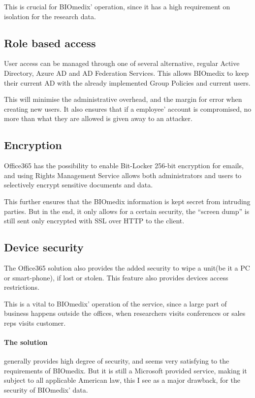 \documentclass[paper=a4, fontsize=11pt]{scrartcl} %
\numberwithin{equation}{section} %
\numberwithin{figure}{section} %
\numberwithin{table}{section} %
\begin{document}
This is crucial for BIOmedix' operation, since it has a high requirement on
isolation for the research data. 

\subsection{Role based access}
User access can be managed through one of several alternative, regular Active
Directory, Azure AD and AD Federation Services. This allows BIOmedix to keep
their current AD with the already implemented Group Policies and current users.

This will minimise the administrative overhead, and the margin for error when
creating new users. It also ensures that if a employee' account is compromised,
no more than what they are allowed is given away to an attacker.

\subsection{Encryption}
Office365 has the possibility to enable Bit-Locker 256-bit encryption for
emails, and using Rights Management Service allows both administrators and
users to selectively encrypt sensitive documents and data.

This further ensures that the BIOmedix information is kept secret from
intruding parties. But in the end, it only allows for a certain security, the
``screen dump'' is still sent only encrypted with SSL over HTTP to the client.

\subsection{Device security}
The Office365 solution also provides the added security to wipe a unit(be it a
PC or smart-phone), if lost or stolen. This feature also provides devices access
restrictions.

This is a vital to BIOmedix' operation of the service, since a large part of
business happens outside the offices, when researchers visits conferences or
sales reps visits customer.

\paragraph{The solution} generally provides high degree of security, and seems
very satisfying to the requirements of BIOmedix. But it is still a Microsoft
provided service, making it subject to all applicable American law, this I see
as a major drawback, for the security of BIOmedix' data.
\end{document}
